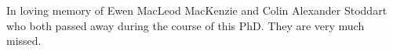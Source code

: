 \begin{dedication}
In loving memory of Ewen MacLeod MacKenzie and Colin Alexander Stoddart who both passed away during the course of this PhD. They are very much missed.  
\end{dedication}